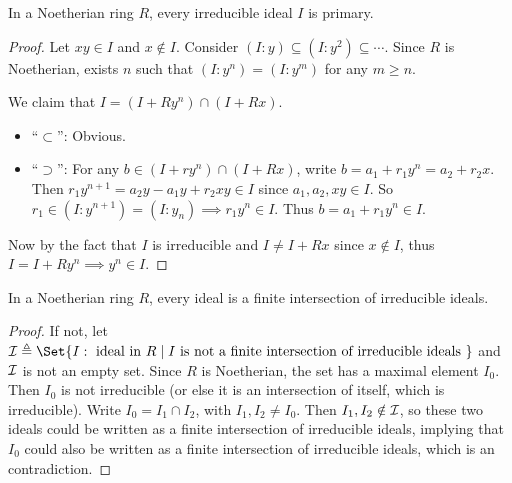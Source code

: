 \begin{theorem} \label{thm:noeth-irr-ideal-is-primary}
  In a Noetherian ring $R$, every irreducible ideal $I$ is primary.

  \begin{proof}
    Let $xy \in I$ and $x \notin I$. Consider $(I : y) \subseteq (I: y^2) \subseteq \dotsm$.
    Since $R$ is Noetherian, exists $n$ such that $(I: y^n) = (I: y^m)$ for any $m \geq n$.

    We claim that $I = (I + Ry^n) \cap (I + Rx)$.
    \begin{itemize}
      \item ``$\subset$'': Obvious.
      \item ``$\supset$'': For any $b \in (I + ry^n) \cap (I + Rx)$,
        write $b = a_1 + r_1 y^{n} = a_2 + r_2 x$. Then
        $r_1 y^{n+1} = a_2 y - a_1 y + r_2 x y \in I$ since $a_1, a_2, xy \in I$.
        So $r_1 \in (I: y^{n+1}) = (I: y_n) \implies r_1 y^n \in I$.
        Thus $b = a_1 + r_1 y^n \in I$.
    \end{itemize}

    Now by the fact that $I$ is irreducible and $I \neq I + Rx$ since $x \notin I$,
    thus $I = I + Ry^n \implies y^n \in I$.
  \end{proof}
\end{theorem}

\begin{theorem} \label{thm:noeth-ideal-is-finite-intersection}
  In a Noetherian ring $R$, every ideal is a finite intersection of irreducible ideals.

  \begin{proof}
    If not, let $\Ic \triangleq \Set{I: \text{ ideal in } R \mid I \text{ is not a finite intersection
        of irreducible ideals }}$ and $\mathcal{I}$ is not an empty set.
    Since $R$ is Noetherian, the set has a maximal element $I_0$. Then $I_0$ is not
    irreducible (or else it is an intersection of itself, which is irreducible).
    Write $I_0 = I_1 \cap I_2$, with $I_1, I_2 \neq I_0$. Then $I_1, I_2 \notin \mathcal{I}$,
    so these two ideals could be written as a finite intersection of irreducible ideals,
    implying that $I_0$ could also be written as a finite intersection of irreducible ideals,
    which is an contradiction.
  \end{proof}
\end{theorem}

